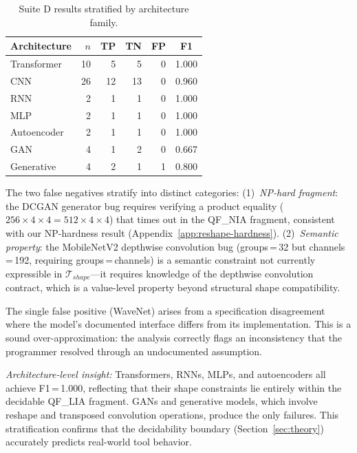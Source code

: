 \documentclass[11pt]{article}
\begin{document}
\begin{table}[h]
\centering
\caption{Suite D results stratified by architecture family.}
\label{tab:suite-d-arch}
\small
\begin{tabular}{@{}lrrrrc@{}}
\toprule
\textbf{Architecture} & \textbf{$n$} & \textbf{TP} & \textbf{TN} &
\textbf{FP} & \textbf{F1} \\
\midrule
Transformer & 10 & 5 & 5 & 0 & 1.000 \\
CNN         & 26 & 12 & 13 & 0 & 0.960 \\
RNN         &  2 & 1 & 1 & 0 & 1.000 \\
MLP         &  2 & 1 & 1 & 0 & 1.000 \\
Autoencoder &  2 & 1 & 1 & 0 & 1.000 \\
GAN         &  4 & 1 & 2 & 0 & 0.667 \\
Generative  &  4 & 2 & 1 & 1 & 0.800 \\
\bottomrule
\end{tabular}
\end{table}

The two false negatives stratify into distinct categories:
(1)~\emph{NP-hard fragment}: the DCGAN generator bug requires
verifying a product equality ($256 \times 4 \times 4 = 512 \times 4
\times 4$) that times out in the QF\_NIA fragment, consistent with
our NP-hardness result (Appendix~\ref{app:reshape-hardness}).
(2)~\emph{Semantic property}: the MobileNetV2 depthwise convolution
bug (groups\,=\,32 but channels\,=\,192, requiring groups\,=\,channels)
is a semantic constraint not currently expressible in
$\mathcal{T}_{\mathit{shape}}$---it requires knowledge of the
depthwise convolution contract, which is a value-level property
beyond structural shape compatibility.

The single false positive (WaveNet) arises from a specification
disagreement where the model's documented interface differs from
its implementation.  This is a sound over-approximation: the
analysis correctly flags an inconsistency that the programmer
resolved through an undocumented assumption.

\emph{Architecture-level insight:} Transformers, RNNs, MLPs, and
autoencoders all achieve F1\,=\,1.000, reflecting that their shape
constraints lie entirely within the decidable QF\_LIA fragment.
GANs and generative models, which involve reshape and transposed
convolution operations, produce the only failures.
This stratification confirms that the decidability boundary
(Section~\ref{sec:theory}) accurately predicts real-world tool behavior.
\end{document}
